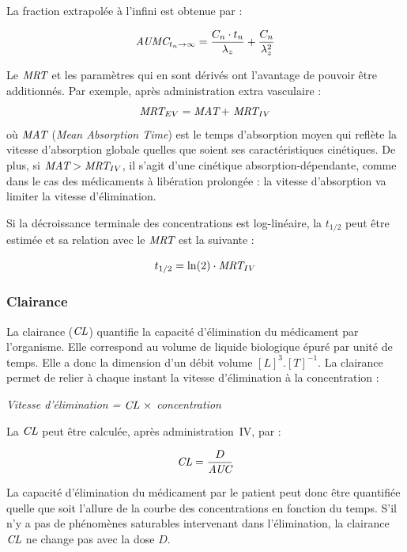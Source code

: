 La fraction extrapolée à l'infini est obtenue par :

\begin{equation}
\operatorname{\textit{AUMC}}_{t_n \to \infty} = \frac{C_n \cdot t_n}{\lambda_z}+\frac{C_n }{\lambda_z^2}
\label{eq:8}
\end{equation}

Le $\operatorname{\textit{MRT}}$ et les paramètres qui en sont dérivés ont l'avantage de pouvoir être additionnés. Par exemple, après administration extra vasculaire :
\begin{equation}
\operatorname{\textit{MRT}}_{EV} = \operatorname{\textit{MAT}} + \, \operatorname{\textit{MRT}}_{IV}
\label{eq:9}
\end{equation}
où $\operatorname{\textit{MAT}}$ (\textit{Mean Absorption Time}) est le temps d'absorption moyen qui reflète la vitesse d'absorption globale quelles que soient ses caractéristiques cinétiques. De plus, si $\operatorname{\textit{MAT}} > \operatorname{\textit{MRT}}_{IV}$, il s'agit d'une cinétique absorption-dépendante, comme dans le cas des médicaments à libération prolongée : la vitesse d'absorption va limiter la vitesse d'élimination.

Si la décroissance terminale des concentrations est log-linéaire, la $t_{1/2}$ peut être estimée et sa relation avec le $\operatorname{\textit{MRT}}$ est la suivante :

\begin{equation}
t_{1/2} = \ln(2)\cdot \operatorname{\textit{MRT}}_{IV}
\label{eq:10}
\end{equation}

\subsubsection{Clairance} 
La clairance ($\operatorname{\textit{CL}}$) quantifie la capacité d'élimination du médicament par l'organisme. Elle correspond au volume de liquide biologique épuré par unité de temps. Elle a donc la dimension d'un débit volume $[L]^3.[T]^{-1}$. La clairance permet de relier à chaque instant la vitesse d'élimination à la concentration :

\begin{center}
\textit{Vitesse d'élimination = $\operatorname{\textit{CL}} \, \times$ concentration}
\end{center}

La $\operatorname{\textit{CL}}$ peut être calculée, après administration~IV, par :

\begin{equation}
\operatorname{\textit{CL}} = \frac{D}{\operatorname{\textit{AUC}}}
\label{eq:11}
\end{equation}

La capacité d'élimination du médicament par le patient peut donc être quantifiée quelle que soit l'allure de la courbe des concentrations en fonction du temps. S'il n'y a pas de phénomènes saturables intervenant dans l'élimination, la clairance $\operatorname{\textit{CL}}$ ne change pas avec la dose $D$.

